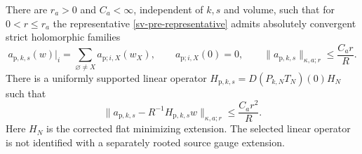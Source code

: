 \begin{theorem}
\label{sv-support-theorem}
There are $r_a>0$ and $C_a<\infty$, independent of $k,s$ and volume,
such that for $0<r\le r_a$ the representative
\eqref{sv-pre-representative} admits absolutely convergent strict
holomorphic families
\begin{equation}
 a_{\mathrm p,k,s}(w)|_i
   =\sum_{\varnothing\ne X}a_{\mathrm p;i,X}(w_X),\qquad
 a_{\mathrm p;i,X}(0)=0,\qquad
 \|a_{\mathrm p,k,s}\|_{\kappa,a;r}\le \frac{C_ar}{R}.
 \label{sv-supported-amplitude}
\end{equation}
There is a uniformly supported linear operator
$H_{\mathrm p,k,s}=D(P_{k,N}T_N)(0)H_N$ such that
\begin{equation}
 \|a_{\mathrm p,k,s}-R^{-1}H_{\mathrm p,k,s}w\|_{\kappa,a;r}
       \le \frac{C_ar^2}{R}.
 \label{sv-supported-remainder}
\end{equation}
Here $H_N$ is the corrected flat minimizing extension. The selected
linear operator is not identified with a separately rooted source
gauge extension.
\end{theorem}

